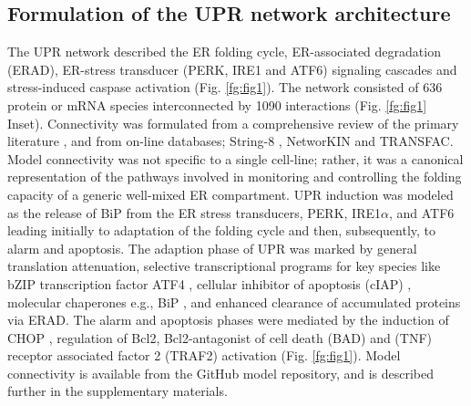 \documentclass[fleqn,10pt]{wlscirep}
\begin{document}
\subsection*{Formulation of the UPR network architecture}
The UPR network described the ER folding cycle, ER-associated degradation (ERAD), ER-stress transducer (PERK, IRE1 and ATF6) signaling cascades and stress-induced caspase activation (Fig. \ref{fg:fig1}).
The network consisted of 636 protein or mRNA species interconnected by 1090 interactions (Fig. \ref{fg:fig1} Inset).
Connectivity was formulated from a comprehensive review of the primary literature  \cite{naidoo2009er, ron2002translational, kaufman2002unfolded,ellgaard2003qce,Fonseca:2009fk,Schroder:2005vn,gotoh:hdc,mccullough2001gsc, belmont2008cga,Hetz:2009qc,Urano:2000uq,szegezdi2006mediators}, and from on-line databases; String-8 \cite{Jensen:2009fk}, NetworKIN \cite{Linding:2007fk} and TRANSFAC.
Model connectivity was not specific to a single cell-line; rather, it was a canonical representation of the pathways involved in monitoring and controlling the folding capacity of a generic well-mixed ER compartment.
UPR induction was modeled as the release of BiP from the ER stress transducers, PERK, IRE1$\alpha$, and ATF6 leading initially to adaptation of the folding cycle and then, subsequently, to alarm and apoptosis.
The adaption phase of UPR was marked by general translation attenuation, selective transcriptional programs for key species like bZIP transcription factor ATF4 \cite{lu2004tra}, cellular inhibitor of apoptosis (cIAP) \cite{hamanaka2008pdr}, molecular chaperones e.g., BiP \cite{harding2003isr}, and enhanced clearance of accumulated proteins via ERAD.
The alarm and apoptosis phases were mediated by the induction of CHOP \cite{ron1992cnd}, regulation of Bcl2, Bcl2-antagonist of cell death (BAD) \cite {wang1999cia} and (TNF) receptor associated factor 2 (TRAF2) \cite{lei2003jpb,putcha2003jmb, yamamoto1999bpa, szegezdi2006mediators} activation (Fig. \ref{fg:fig1}).
Model connectivity is available from the GitHub model repository, and is described further in the supplementary materials.



\end{document}
